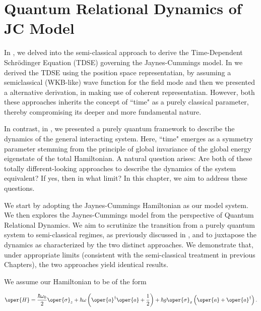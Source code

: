 \chapter{Quantum Relational Dynamics of JC Model
\label{chap5:RDQ_JCM_chap}}

In , we delved into the semi-classical approach to derive the Time-Dependent Schrödinger 
Equation (TDSE) governing the Jaynes-Cummings model. 
In  we derived the TDSE using the position space representatian, 
by assuming a semiclassical (WKB-like) wave function for the field mode and then 
we presented a alternative derivation, in  making use of coherent representatian.
However, 
both these approaches inherits the concept of ``time" as a purely classical parameter, 
thereby compromising its deeper and more fundamental nature.

In contrast, in , we presented a purely quantum framework to 
describe the dynamics of the general interacting system. Here, ``time" emerges as a 
symmetry parameter stemming from the principle of global invariance of the global 
energy eigenstate of the total Hamiltonian. A natural question arises: Are both of 
these totally different-looking approaches to describe the dynamics of the system 
equivalent? If yes, then in what limit? In this chapter, we aim to address these questions.

We start by adopting the Jaynes-Cummings Hamiltonian as our model system. We then 
explores the Jaynes-Cummings model from the perspective of Quantum Relational Dynamics. 
We aim to scrutinize the transition from a purely quantum system to semi-classical regimes, 
as previously discussed in , and to juxtapose the dynamics as 
characterized by the two distinct approaches. We demonstrate that, under appropriate limits
(consistent with the semi-classical treatment in previous Chapters), the two approaches yield identical results. 

We assume our Hamiltonian to be of the form

\begin{mdframed}
\begin{eqnarray}
        \label{eq:chap5_JCM_Hamiltonian}
        \oper{H} = \frac{\hbar \omega_0}{2} \oper{\sigma}_z + \hbar \omega \left(\oper{a}^\dagger \oper{a} + \frac{1}{2}\right) 
        + \hbar g \oper{\sigma}_x\left(\oper{a} + \oper{a}^\dagger\right). 
\end{eqnarray}
\end{mdframed}


